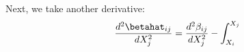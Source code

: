 Next, we take another derivative:
\begin{equation}
\frac{d^2 \betahat_{i j}}{d X_j^2} = \frac{d^2 \beta_{i j}}{d X_j^2} - \int_{X_i}^{X_j}
\end{equation}
  